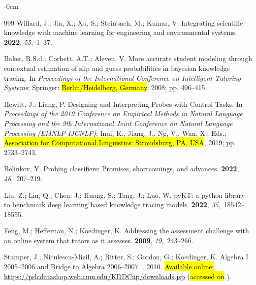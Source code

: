 \documentclass[applsci,article,accept,moreauthors,pdftex]{Definitions/mdpi}
\begin{document}
\begin{adjustwidth}{-\extralength}{0cm}
\begin{thebibliography}{999}
Willard, J.; Jia, X.; Xu, S.; Steinbach, M.; Kumar, V.
\newblock Integrating scientific knowledge with machine learning for
  engineering and environmental systems.
 {\bf 2022}, {\em 55},~1--37.

Baker, R.S.d.; Corbett, A.T.; Aleven, V.
\newblock More accurate student modeling through contextual estimation of slip
  and guess probabilities in bayesian knowledge tracing.
\newblock In \textit{Proceedings of the International Conference on Intelligent
  Tutoring Systems}; Springer: \hl{Berlin/Heidelberg, Germany},  2008; pp. 406--415.

Hewitt, J.; Liang, P.
\newblock Designing and Interpreting Probes with Control Tasks.
\newblock In \textit{Proceedings of the 2019 Conference on Empirical
  Methods in Natural Language Processing and the 9th International Joint
  Conference on Natural Language Processing (EMNLP-IJCNLP)}; Inui, K., Jiang,
  J., Ng, V., Wan, X., Eds.; \hl{Association for Computational Linguistics: Stroudsburg, PA, USA},  2019; pp. 2733--2743.

Belinkov, Y.
\newblock Probing classifiers: Promises, shortcomings, and advances.
 {\bf 2022}, {\em 48},~207--219.

Liu, Z.; Liu, Q.; Chen, J.; Huang, S.; Tang, J.; Luo, W.
\newblock pyKT: a python library to benchmark deep learning based knowledge
  tracing models.
 {\bf 2022},
  {\em 35},~18542--18555.

Feng, M.; Heffernan, N.; Koedinger, K.
\newblock Addressing the assessment challenge with an online system that tutors
  as it assesses.
 {\bf 2009}, {\em
  19},~243--266.

Stamper, J.; Niculescu-Mizil, A.; Ritter, S.; Gordon, G.; Koedinger, K.
\newblock Algebra I 2005--2006 and Bridge to Algebra 2006--2007.
. {2010}.
 \hl{Available online:} %
 \url{https://pslcdatashop.web.cmu.edu/KDDCup/downloads.jsp}  (\hl{accessed on}%
).


\end{thebibliography}
\end{adjustwidth}
\end{document}
